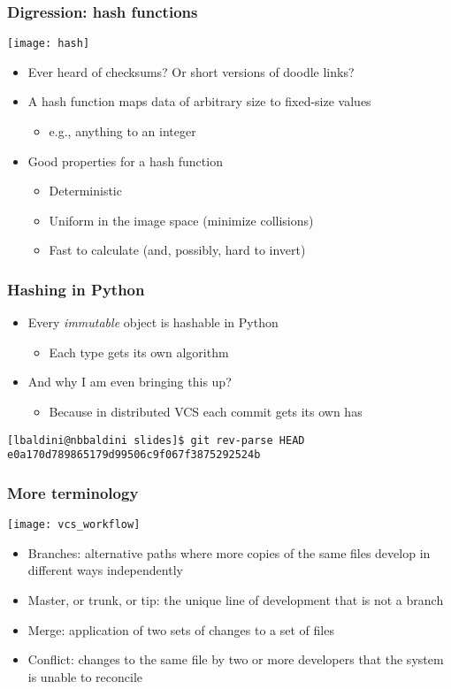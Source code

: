 \documentclass[9pt]{beamer}
\begin{document}
\begin{frame}
  \frametitle{Digression: hash functions}
  \centering\texttt{[image: hash]}
  \begin{itemize}
  \item Ever heard of checksums? Or short versions of doodle links?
  \item \alert{A hash function maps data of arbitrary size to fixed-size values}
    \begin{itemize}
    \item e.g., anything to an integer
    \end{itemize}
  \item Good properties for a hash function
    \begin{itemize}
    \item Deterministic
    \item Uniform in the image space (minimize collisions)
    \item Fast to calculate (and, possibly, hard to invert)
    \end{itemize}
  \end{itemize}
\end{frame}


\begin{frame}[fragile]
  \frametitle{Hashing in Python}
  
  \begin{itemize}
  \item Every \emph{immutable} object is hashable in Python
    \begin{itemize}
    \item Each type gets its own algorithm
    \end{itemize}
  \item And why I am even bringing this up?
    \begin{itemize}
    \item Because in distributed VCS each commit gets its own has
    \end{itemize}
  \end{itemize}
  \begin{Verbatim}
[lbaldini@nbbaldini slides]$ git rev-parse HEAD
e0a170d789865179d99506c9f067f3875292524b
  \end{Verbatim}
\end{frame}


\begin{frame}
  \frametitle{More terminology}
  \centering\texttt{[image: vcs\_workflow]}
  
  \begin{itemize}
  \item \alert{Branches}: alternative paths where more copies of the same files
    develop in different ways independently
  \item \alert{Master, or trunk, or tip}: the unique line of development that
    is not a branch
  \item \alert{Merge}: application of two sets of changes to a set of files
  \item \alert{Conflict}: changes to the same file by two or more developers
    that the system is unable to reconcile
  \end{itemize}
\end{frame}
\end{document}
